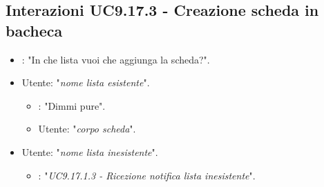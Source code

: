 \subsection{Interazioni UC9.17.3 - Creazione scheda in bacheca }
 \begin{itemize}
        \item {}: "In che lista vuoi che aggiunga la scheda?".
        \item Utente: "{\it nome lista esistente}".
        \begin{itemize}
        \item {}: "Dimmi pure".
        \item Utente: "{\it corpo scheda}".
           \end{itemize}
        \item Utente: "{\it nome lista inesistente}".
           \begin{itemize}
        \item {}: "{\it UC9.17.1.3 - Ricezione notifica lista inesistente}".
           \end{itemize}
    \end{itemize}


